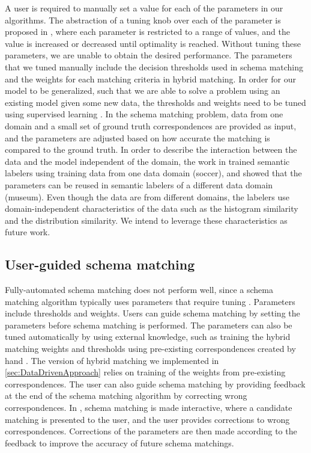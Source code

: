 A user is required to manually set a value for each of the parameters in our algorithms. The abstraction of a tuning knob over each of the parameter is proposed in \cite{books/sp/bellahsene11}, where each parameter is restricted to a range of values, and the value is increased or decreased until optimality is reached. Without tuning these parameters, we are unable to obtain the desired performance. The parameters that we tuned manually include the decision thresholds used in schema matching and the weights for each matching criteria in hybrid matching. In order for our model to be generalized, such that we are able to solve a problem using an existing model given some new data, the thresholds and weights need to be tuned using supervised learning \cite{Duchateau2009YAM} \cite{Doan2001Reconciling}. In the schema matching problem, data from one domain and a small set of ground truth correspondences are provided as input, and the parameters are adjusted based on how accurate the matching is compared to the ground truth. In order to describe the interaction between the data and the model independent of the domain, the work in \cite{Pham2016Semantic} trained semantic labelers using training data from one data domain (soccer), and showed that the parameters can be reused in semantic labelers of a different data domain (museum). Even though the data are from different domains, the labelers use domain-independent characteristics of the data such as the histogram similarity and the distribution similarity. We intend to leverage these characteristics as future work.

\subsection{User-guided schema matching}

Fully-automated schema matching does not perform well, since a schema matching algorithm typically uses parameters that require tuning \cite{books/sp/bellahsene11}. Parameters include thresholds and weights. Users can guide schema matching by setting the parameters before schema matching is performed. The parameters can also be tuned automatically by using external knowledge, such as training the hybrid matching weights and thresholds using pre-existing correspondences created by hand \cite{Ehrig2004QOM}. The version of hybrid matching we implemented in \autoref{sec:DataDrivenApproach} relies on training of the weights from pre-existing correspondences. The user can also guide schema matching by providing feedback at the end of the schema matching algorithm by correcting wrong correspondences. In \cite{Duchateau2009YAM}, schema matching is made interactive, where a candidate matching is presented to the user, and the user provides corrections to wrong correspondences. Corrections of the parameters are then made according to the feedback to improve the accuracy of future schema matchings.


